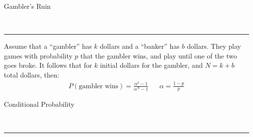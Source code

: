 \documentclass{article}
\newcommand{\header}[1]{\begin{large}\noindent #1\end{large}\\\rule{\textwidth}{0.5pt}}
\begin{document}
\pagebreak

\header{Gambler's Ruin}

Assume that a ``gambler'' has $k$ dollars and a ``banker'' has $b$ dollars.
They play games with probability $p$ that the gambler wins, and play 
until one of the two goes broke. It follows that for $k$ initial dollars
for the gambler, and $N = k + b$ total dollars, then:
\begin{align*}
    P(\textrm{gambler wins}) = \frac{\alpha^k - 1}{\alpha^N - 1} && \alpha = \frac{1-p}{p}
\end{align*}

\header{Conditional Probability}
\end{document}
